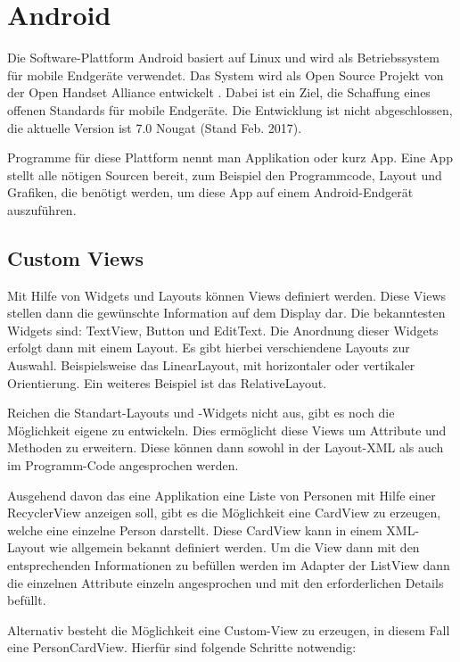 \section{Android}\label{sec:android}
Die Software-Plattform Android basiert auf Linux und wird als Betriebssystem für mobile Endgeräte verwendet.
Das System wird als Open Source Projekt von der Open Handset Alliance entwickelt \cite{open_handset_alliance}. Dabei ist ein Ziel, die Schaffung eines offenen Standards für mobile Endgeräte.
Die Entwicklung ist nicht abgeschlossen, die aktuelle Version ist 7.0 Nougat (Stand Feb. 2017).

Programme für diese Plattform nennt man Applikation oder kurz App. Eine App stellt alle nötigen Sourcen bereit, zum Beispiel den Programmcode, Layout und Grafiken, die benötigt werden, um diese App auf einem Android-Endgerät auszuführen.

\subsection{Custom Views}
Mit Hilfe von Widgets und Layouts können Views definiert werden. Diese Views stellen dann die gewünschte Information auf dem Display dar. Die bekanntesten Widgets sind: TextView, Button und EditText. Die Anordnung dieser Widgets erfolgt dann mit einem Layout. Es gibt hierbei verschiendene Layouts zur Auswahl. Beispielsweise das LinearLayout, mit horizontaler oder vertikaler Orientierung. Ein weiteres Beispiel ist das RelativeLayout.

Reichen die Standart-Layouts und -Widgets nicht aus, gibt es noch die Möglichkeit eigene zu entwickeln. Dies ermöglicht diese Views um Attribute und Methoden zu erweitern. Diese können dann sowohl in der Layout-XML als auch im Programm-Code angesprochen werden.

Ausgehend davon das eine Applikation eine Liste von Personen mit Hilfe einer RecyclerView anzeigen soll, gibt es die Möglichkeit eine CardView zu erzeugen, welche eine einzelne Person darstellt. Diese CardView kann in einem XML-Layout wie allgemein bekannt definiert werden. Um die View dann mit den entsprechenden Informationen zu befüllen werden im Adapter der ListView dann die einzelnen Attribute einzeln angesprochen und mit den erforderlichen Details befüllt.

Alternativ besteht die Möglichkeit eine Custom-View zu erzeugen, in diesem Fall eine PersonCardView.
Hierfür sind folgende Schritte notwendig:

